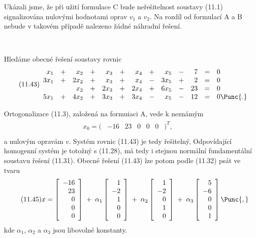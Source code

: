 Ukázali jsme, že při užití formulace C bude neřešitelnost
soustavy (11.1) signalizována nulovými hodnotami oprav $v_1$ a $v_2$.
Na rozdíl od formulací A a B nebude v takovém případě nalezeno
žádné náhradní řešení.

~

\noindent
{}

Hledáme obecné řešení soustavy rovnic
%
\begin{align*}
  \tag{11.43}
  \begin{array}{rrrrrrrrrrrrl}
     x_1 &+&  x_2 &+&  x_3 &+&  x_4 &+&  x_5 &-&  7 &=& 0 \\
    3x_1 &+& 2x_2 &+&  x_3 &+&  x_4 &-& 3x_5 &+&  2 &=& 0 \\
         & &  x_2 &+& 2x_3 &+& 2x_4 &+& 6x_5 &-& 23 &=& 0 \\
    5x_1 &+& 4x_2 &+& 3x_3 &+& 3x_4 &-&  x_5 &-& 12 &=& 0\Punc{.} \\
  \end{array}
\end{align*}

\noindent
Ortogonalizace (11.3), založená na formuiaci A, vede k neznámým
%
\begin{align*}
  \tag{11.44}
  \begin{array}{ccccccc}
  x_0 = (& -16 & 23 & 0 &  0  &  0  &)^T,\\
  \end{array}
\end{align*}
%
a nulovým opravám $v$. Systém rovnic (11.43) je tedy řešitelný,
Odpovídající homogenní systém je totožný s (11.28), má tedy i
stejnou normální fundamentální soustavu řešení (11.31). Obecné
řešení (11.43) lze potom podle (11.32) psát ve tvaru
\begin{align*}
  \tag{11.45}
  x =
  \left[\begin{array}{r} -16\\23\\0\\0\\0\\\end{array} \right]
  \;+\; \alpha_1
  \left[\begin{array}{r} 1\\-2\\1\\0\\0\end{array} \right]
  \;+\; \alpha_2
  \left[\begin{array}{r} 1\\-2\\0\\1\\0\\\end{array} \right]
  \;+\; \alpha_3
  \left[\begin{array}{r} 5\\-6\\0\\0\\1\\\end{array} \right]
  \Punc{,}
\end{align*}
%
kde $\alpha_1$, $\alpha_2$ a  $\alpha_3$ jsou libovolné konstanty.
